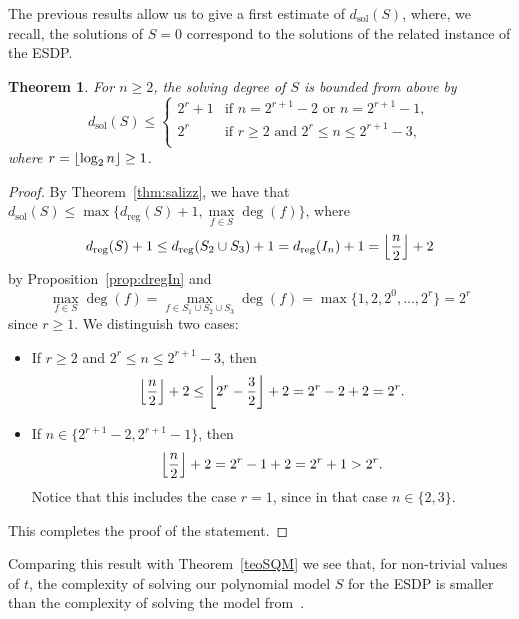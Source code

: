 \documentclass[11pt]{article}
\DeclarePairedDelimiter{\fl}{\lfloor}{\rfloor}
\theoremstyle{plain}
\newtheorem{theo}{Theorem}[section]
\theoremstyle{definition}
\theoremstyle{remark}
\begin{document}
The previous results allow us to give a first estimate of $d_{\operatorname{sol}}(S)$, where, we recall, the solutions of $S=0$ correspond to the solutions of the related instance of the ESDP.
\begin{theo}\label{cordsolS}
    For $n\geq 2$, the solving degree of $S$ is bounded from above by
    \begin{equation}
        d_{\operatorname{sol}}(S)\leq\begin{cases}
            2^r+1 & \text{if }n=2^{r+1}-2\text{ or }n=2^{r+1}-1,\\
            2^r & \text{if }r\geq 2\text{ and }2^r\leq n\leq 2^{r+1}-3,\\
        \end{cases}
    \end{equation}
    where $r=\fl*{\operatorname{log}_2 n}\geq 1$.
\end{theo}
\begin{proof}
    By Theorem~\ref{thm:salizz}, we have that $d_{\operatorname{sol}}(S)\leq\max\{d_{\operatorname{reg}}(S)+1,\underset{f\in S}{\max}\operatorname{deg}(f)\}$, where
    \begin{equation*}
        d_{\operatorname{reg}}(S)+1\leq d_{\operatorname{reg}}(S_2\cup S_3)+1=d_{\operatorname{reg}}(I_n)+1=\fl*{\frac{n}{2}}+2
    \end{equation*}
    by Proposition~\ref{prop:dregIn} and
    \begin{equation*}
        \underset{f\in S}{\max}\operatorname{deg}(f)=\underset{f\in S_1\cup S_2\cup S_3}{\max}\operatorname{deg}(f)=\operatorname{max}\{1,2,2^0,\dots,2^r\}=2^r
    \end{equation*}
    since $r\geq 1$. We distinguish two cases:
    \begin{itemize}
        \item If $r\geq 2$ and $2^r\leq n\leq 2^{r+1}-3$, then 
        $$\fl*{\frac{n}{2}}+2\leq\fl*{2^r-\frac{3}{2}}+2=2^r-2+2=2^r.$$
        \item If $n\in\{2^{r+1}-2, 2^{r+1}-1\}$, then
        $$\fl*{\frac{n}{2}}+2=2^r-1+2=2^r+1> 2^r.$$
        Notice that this includes the case $r=1$, since in that case $n\in\{2,3\}$.
    \end{itemize}
    This completes the proof of the statement.
    
\end{proof}

Comparing this result with Theorem~\ref{teoSQM} we see that, for non-trivial values of $t$, the complexity of solving our polynomial model $S$ for the ESDP is smaller than the complexity of solving the model from~\cite{caminata2025quadraticmodelingssyndromedecoding}. \\
\end{document}
